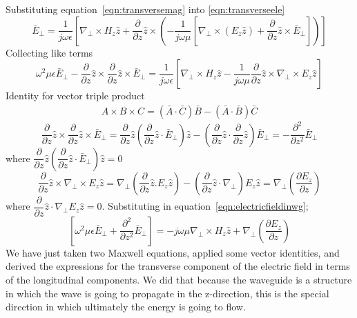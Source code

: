 Substituting equation~\ref{eqn:transversemag} into \ref{eqn:transverseele}
\begin{dmath*}
\bar{E}_\bot = \frac{1}{j\omega\epsilon} \left[\nabla_\bot\times H_z\hat{z} + \frac{\partial}{\partial z}\hat{z}\times \left( -\frac{1}{j\omega\mu} \left[\nabla_\bot\times(E_z\hat{z}) + \frac{\partial}{\partial z}\hat{z}\times\bar{E}_\bot\right] \right)\right] 
\end{dmath*}
Collecting like terms
\begin{dmath}
\omega^2\mu\epsilon\bar{E}_\bot-\frac{\partial}{\partial z}\hat{z}\times\frac{\partial}{\partial z}\hat{z}\times\bar{E}_\bot = \frac{1}{j\omega\epsilon} \left[\nabla_\bot\times H_z\hat{z} - \frac{1}{j\omega\mu}\frac{\partial}{\partial z}\hat{z}\times\nabla_\bot\times E_z \hat{z} \right]
\label{eqn:electricfieldinwg}
\end{dmath}
Identity for vector triple product
\begin{align*}
A\times B\times C = (\bar{A}\cdot\bar{C})\bar{B} - (\bar{A}\cdot\bar{B})\bar{C}
\end{align*}
\begin{dmath*}
\frac{\partial}{\partial z}\hat{z}\times\frac{\partial}{\partial z}\hat{z}\times\bar{E}_\bot = \frac{\partial}{\partial z}\hat{z}\left(\frac{\partial}{\partial z}\hat{z}\cdot\bar{E}_\bot\right)\hat{z} - \left(\frac{\partial}{\partial z}\hat{z}\cdot\frac{\partial}{\partial z}\hat{z}\right)\bar{E}_\bot = -\frac{\partial^2}{\partial z^2}\bar{E}_\bot
\end{dmath*}
where $\dfrac{\partial}{\partial z}\hat{z}\left(\dfrac{\partial}{\partial z}\hat{z}\cdot\bar{E}_\bot\right)\hat{z} = 0$
\begin{dmath*}
\frac{\partial}{\partial z}\hat{z}\times\nabla_\bot\times E_z\hat{z} = \nabla_\bot\left(\frac{\partial}{\partial z}\hat{z}.E_z\hat{z}\right) - \left(\frac{\partial}{\partial z}\hat{z}\cdot\nabla_\bot\right)E_z\hat{z} = \nabla_\bot\left(\frac{\partial E_z}{\partial z}\right)
\end{dmath*}
where $\dfrac{\partial}{\partial z}\hat{z}\cdot\nabla_\bot E_z\hat{z} = 0$. Substituting in equation~\ref{eqn:electricfieldinwg};
\begin{dmath}
\left[\omega^2\mu\epsilon\bar{E}_\bot+\frac{\partial^2}{\partial z^2}\bar{E}_\bot\right] = -j\omega\mu\nabla_\bot\times H_z\hat{z} + \nabla_\bot\left(\frac{\partial E_z}{\partial z}\right)
\end{dmath}
We have just taken two Maxwell equations, applied some vector identities, and derived the expressions for the transverse component of the electric field in terms of the longitudinal components. We did that because the waveguide is a structure in which the wave is going to propagate in the z-direction, this is the special direction in which ultimately the energy is going to flow.

